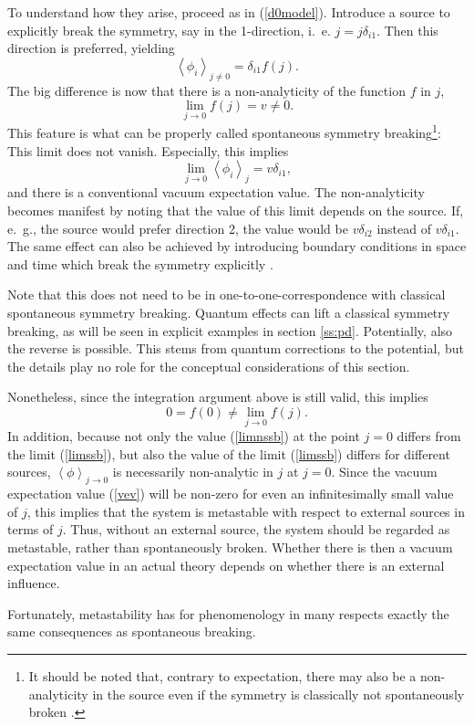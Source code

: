 \documentclass[final,12pt,3p,longtitle]{elsarticle}
\newcommand*{\no}{\noindent}
\newcommand*{\be}{\begin{equation}}
\newcommand*{\ee}{\end{equation}}
\newcommand*{\pref}[1]{(\ref{#1})}
\newcommand*{\1}{1\!\!\!\bot}
\newcommand*{\la}{\left\langle}
\newcommand*{\ra}{\right\rangle}
\begin{document}
To understand how they arise, proceed as in \pref{d0model}. Introduce a source to explicitly break the symmetry, say in the 1-direction, i.\ e. $j=j\delta_{i1}$. Then this direction is preferred, yielding
\be
\la\phi_i\ra_{j\neq 0}=\delta_{i1}f(j)\label{vev}.
\ee
\no The big difference is now that there is a non-analyticity of the function $f$ in $j$,
\be
\lim_{j\to 0}f(j)=v\neq 0\label{vevlimit}.
\ee
\no This feature is what can be properly called spontaneous symmetry breaking\footnote{It should be noted that, contrary to expectation, there may also be a non-analyticity in the source even if the symmetry is classically not spontaneously broken \cite{Maas:2013sca}.}: This limit does not vanish. Especially, this implies
\be
\lim_{j\to 0}\la\phi_i\ra_{j}=v\delta_{i1}\label{limssb},
\ee
\no and there is a conventional vacuum expectation value. The non-analyticity becomes manifest by noting that the value of this limit depends on the source. If, e.\ g., the source would prefer direction 2, the value would be $v\delta_{i2}$ instead of $v\delta_{i1}$. The same effect can also be achieved by introducing boundary conditions in space and time which break the symmetry explicitly \cite{Strocchi:2005yk,Frohlich:1976it}.

Note that this does not need to be in one-to-one-correspondence with classical spontaneous symmetry breaking. Quantum effects can lift a classical symmetry breaking, as will be seen in explicit examples in section \ref{ss:pd}. Potentially, also the reverse is possible. This stems from quantum corrections to the potential, but the details play no role for the conceptual considerations of this section.%

Nonetheless, since the integration argument above is still valid, this implies
\be
0=f(0)\neq\lim_{j\to 0}f(j)\label{limnssb}.
\ee
\no In addition, because not only the value \pref{limnssb} at the point $j=0$ differs from the limit \pref{limssb}, but also the value of the limit \pref{limssb} differs for different sources, $\la\phi\ra_{j\to 0}$ is necessarily non-analytic in $j$ at $j=0$. Since the vacuum expectation value \pref{vev} will be non-zero for even an infinitesimally small value of $j$, this implies that the system is metastable with respect to external sources in terms of $j$. Thus, without an external source, the system should be regarded as metastable, rather than spontaneously broken. Whether there is then a vacuum expectation value in an actual theory depends on whether there is an external influence.

Fortunately, metastability has for phenomenology in many respects exactly the same consequences as spontaneous breaking.
\end{document}
